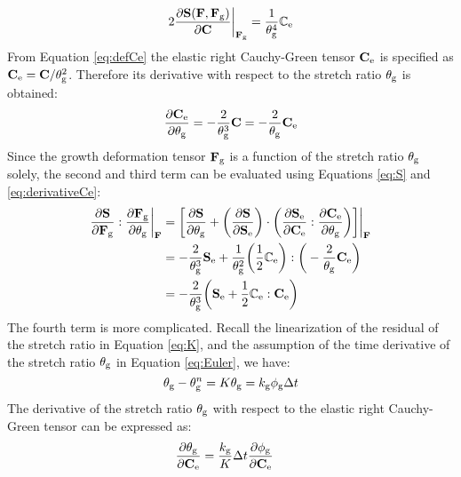 \begin{equation} \label{eq:term1}
2\frac{\partial\bold{S}(\bold{F}, \bold{F}_{\mathrm{g}})}{\partial\bold{C}}\bigg|_{\bold{F}_{\mathrm{g}}} = \frac{1}{\theta_{\mathrm{g}}^4}\mathbb{C}_{\mathrm{e}}
\end{equation}
From Equation \ref{eq:defCe} the elastic right Cauchy-Green tensor $\bold{C}_{\mathrm{e}}$ is specified as $\bold{C}_{\mathrm{e}} = \bold{C}/\theta_{\mathrm{g}}^2$. Therefore its derivative with respect to the stretch ratio $\theta_{\mathrm{g}}$ is obtained:
\begin{equation} \label{eq:derivativeCe}
\frac{\partial\bold{C}_{\mathrm{e}}}{\partial\theta_{\mathrm{g}}} = -\frac{2}{\theta_{\mathrm{g}}^3}\bold{C} = -\frac{2}{\theta_{\mathrm{g}}}\bold{C}_{\mathrm{e}}
\end{equation}
Since the growth deformation tensor $\bold{F}_{\mathrm{g}}$ is a function of the stretch ratio $\theta_{\mathrm{g}}$ solely, the second and third term can be evaluated using Equations \ref{eq:S} and \ref{eq:derivativeCe}:
\begin{equation} \label{eq:term23}
\begin{split}
\frac{\partial\bold{S}}{\partial\bold{F}_{\mathrm{g}}} : \frac{\partial\bold{F}_{\mathrm{g}}}{\partial\theta_{\mathrm{g}}}\bigg|_{\bold{F}} &= \bigg[ \frac{\partial\bold{S}}{\partial\theta_{\mathrm{g}}} +  \bigg(\frac{\partial\bold{S}}{\partial\bold{S}_{\mathrm{e}}}\bigg)\cdot \bigg(\frac{\partial\bold{S}_{\mathrm{e}}}{\partial\bold{C}_{\mathrm{e}}} : \frac{\partial\bold{C}_{\mathrm{e}}}{\partial\theta_{\mathrm{g}}}\bigg) \bigg] \bigg|_{\bold{F}} \\ 
	&= -\frac{2}{\theta_{\mathrm{g}}^3}\bold{S}_{\mathrm{e}} + \frac{1}{\theta_{\mathrm{g}}^2} \bigg(\frac{1}{2}\mathbb{C}_{\mathrm{e}}\bigg) : \bigg( -\frac{2}{\theta_{\mathrm{g}}}\bold{C}_{\mathrm{e}} \bigg) \\
	&= -\frac{2}{\theta_{\mathrm{g}}^3}\bigg( \bold{S}_{\mathrm{e}} + \frac{1}{2}\mathbb{C}_{\mathrm{e}} : \bold{C}_{\mathrm{e}} \bigg)
\end{split}  
\end{equation}
The fourth term is more complicated. Recall the linearization of the residual of the stretch ratio in Equation \ref{eq:K}, and the assumption of the time derivative of the stretch ratio $\theta_{\mathrm{g}}$ in Equation \ref{eq:Euler}, we have:
\begin{equation}
\theta_{\mathrm{g}} - \theta_{\mathrm{g}}^n =  K\theta_{\mathrm{g}} = k_{\mathrm{g}}\phi_{\mathrm{g}}\Delta t
\end{equation}
The derivative of the stretch ratio $\theta_{\mathrm{g}}$ with respect to the elastic right Cauchy-Green tensor can be expressed as:
\begin{equation} \label{eq:nonsense}
\begin{split}
\frac{\partial\theta_{\mathrm{g}}}{\partial\bold{C}_{\mathrm{e}}} &= \frac{k_{\mathrm{g}}}{K} \Delta t \frac{\partial\phi_{\mathrm{g}}}{\partial\bold{C}_{\mathrm{e}}}
\end{split}
\end{equation}
